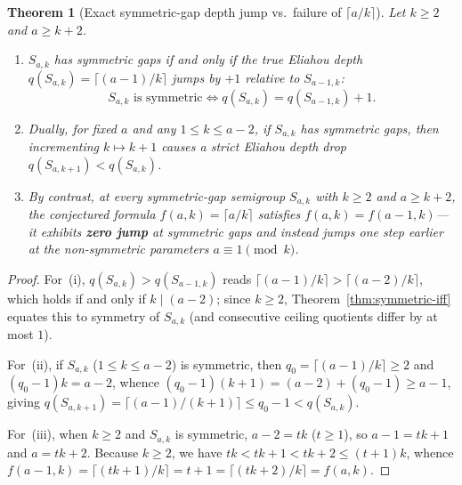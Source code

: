 \documentclass[11pt]{amsart}
\newtheorem{theorem}{Theorem}[section]
\theoremstyle{definition}
\theoremstyle{remark}
\begin{document}
\begin{theorem}[Exact symmetric-gap depth jump vs.\ failure of $\lceil a/k \rceil$]
\label{thm:sym-jump}
Let $k \ge 2$ and $a \ge k + 2$.
\begin{enumerate}
  \item[(i)] $S_{a,k}$ has symmetric gaps if and only if the true Eliahou depth $q(S_{a,k}) = \lceil (a-1)/k \rceil$ jumps by $+1$ relative to $S_{a-1,k}$:
  \[
    S_{a,k}\text{ is symmetric} \iff q(S_{a,k}) = q(S_{a-1,k}) + 1.
  \]
  \item[(ii)] Dually, for fixed $a$ and any $1 \le k \le a - 2$, if $S_{a,k}$ has symmetric gaps, then incrementing $k \mapsto k+1$ causes a strict Eliahou depth drop $q(S_{a,k+1}) < q(S_{a,k})$.
  \item[(iii)] By contrast, at \emph{every} symmetric-gap semigroup $S_{a,k}$ with $k \ge 2$ and $a \ge k + 2$, the conjectured formula $f(a,k) = \lceil a/k \rceil$ satisfies $f(a,k) = f(a-1,k)$---it exhibits \textbf{zero jump} at symmetric gaps and instead jumps one step earlier at the non-symmetric parameters $a \equiv 1 \pmod{k}$.
\end{enumerate}
\end{theorem}

\begin{proof}
For~(i), $q(S_{a,k}) > q(S_{a-1,k})$ reads $\lceil (a-1)/k \rceil > \lceil (a-2)/k \rceil$, which holds if and only if $k \mid (a - 2)$; since $k \ge 2$, Theorem~\ref{thm:symmetric-iff} equates this to symmetry of $S_{a,k}$ (and consecutive ceiling quotients differ by at most $1$).

For~(ii), if $S_{a,k}$ ($1 \le k \le a - 2$) is symmetric, then $q_0 = \lceil (a-1)/k \rceil \ge 2$ and $(q_0 - 1)k = a - 2$, whence $(q_0 - 1)(k + 1) = (a - 2) + (q_0 - 1) \ge a - 1$, giving $q(S_{a,k+1}) = \lceil (a-1)/(k+1) \rceil \le q_0 - 1 < q(S_{a,k})$.

For~(iii), when $k \ge 2$ and $S_{a,k}$ is symmetric, $a - 2 = tk$ ($t \ge 1$), so $a - 1 = tk + 1$ and $a = tk + 2$. Because $k \ge 2$, we have $tk < tk + 1 < tk + 2 \le (t+1)k$, whence $f(a-1,k) = \lceil (tk+1)/k \rceil = t + 1 = \lceil (tk+2)/k \rceil = f(a,k)$.
\end{proof}
\end{document}
